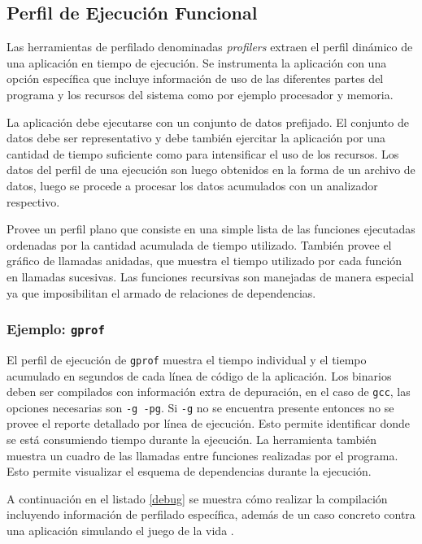 \documentclass[a4paper]{report}
\begin{document}
\subsection{Perfil de Ejecución Funcional}

Las herramientas de perfilado denominadas {\it profilers} extraen el perfil dinámico de una aplicación en tiempo de ejecución. 
Se instrumenta la aplicación con una opción específica que incluye información de uso de las diferentes partes del programa y los recursos del sistema como por ejemplo procesador y memoria.

\bigskip

La aplicación debe ejecutarse con un conjunto de datos prefijado. El conjunto de datos debe ser representativo y debe también ejercitar la aplicación por
una cantidad de tiempo suficiente como para intensificar el uso de los recursos. Los datos del perfil de una ejecución son luego obtenidos en la
forma de un archivo de datos, luego se procede a procesar los datos acumulados con un analizador respectivo.

\bigskip

Provee un perfil plano que consiste en una simple lista de las funciones ejecutadas ordenadas por la cantidad acumulada de tiempo utilizado.
También provee el gráfico de llamadas anidadas, que muestra el tiempo utilizado por cada función en llamadas sucesivas. Las funciones recursivas
son manejadas de manera especial ya que imposibilitan el armado de relaciones de dependencias.

\subsubsection{Ejemplo: {\tt gprof}}

El perfil de ejecución de {\tt gprof} muestra el tiempo individual y el tiempo acumulado en segundos de cada línea de código de la aplicación. Los binarios deben ser compilados con información extra de depuración, en el caso de {\tt gcc}, las opciones necesarias son {\tt -g -pg}. Si {\tt -g} no se encuentra presente entonces no se provee el reporte detallado por línea de ejecución. Esto permite identificar donde se está consumiendo tiempo durante la ejecución.
La herramienta también muestra un cuadro de las llamadas entre funciones realizadas por el programa.
Esto permite visualizar el esquema de dependencias durante la ejecución.

\bigskip

A continuación en el listado \ref{debug} se muestra cómo realizar la compilación incluyendo información de perfilado específica, además de un caso concreto contra una aplicación simulando el juego de la vida \cite{conway}.
\end{document}
